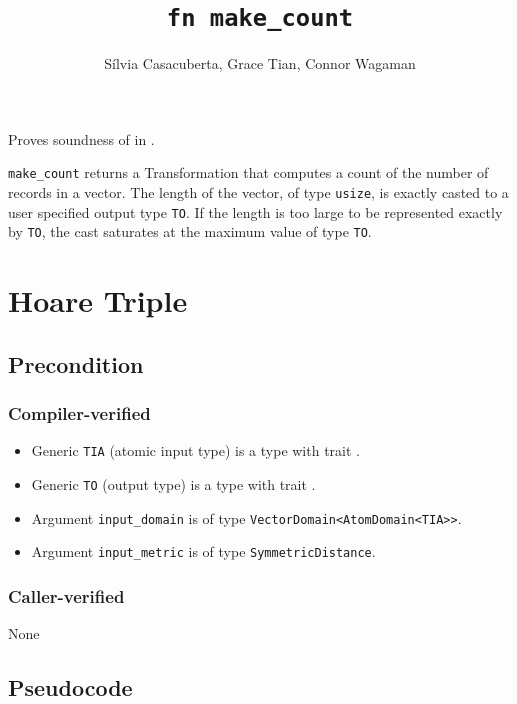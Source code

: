 \documentclass{article}
\title{\texttt{fn make\_count}}
\author{S\'ilvia Casacuberta, Grace Tian, Connor Wagaman}
\date{}
\begin{document}
 
 
\maketitle 
 
Proves soundness of  in . 
 
\texttt{make\_count} returns a Transformation that computes a count of the number of records in a vector. 
The length of the vector, of type \texttt{usize}, is exactly casted to a user specified output type \texttt{TO}. 
If the length is too large to be represented exactly by \texttt{TO},  
the cast saturates at the maximum value of type \texttt{TO}. 
 
\section{Hoare Triple} 
\subsection*{Precondition} 
 
\subsubsection*{Compiler-verified} 
\begin{itemize} 
    \item Generic \texttt{TIA} (atomic input type) is a type with trait . 
    \item Generic \texttt{TO} (output type) is a type with trait . 
    \item Argument \texttt{input\_domain} is of type \texttt{VectorDomain<AtomDomain<TIA>>}. 
    \item Argument \texttt{input\_metric} is of type \texttt{SymmetricDistance}. 
\end{itemize} 
 
\subsubsection*{Caller-verified} 
None 
 
\subsection*{Pseudocode} 
 
 
\end{document}
